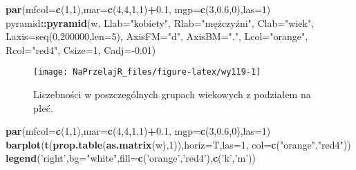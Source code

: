 \documentclass[polish,]{book}
\newenvironment{Shaded}{\begin{snugshade}}{\end{snugshade}}
\newcommand{\DataTypeTok}[1]{\textcolor[rgb]{0.13,0.29,0.53}{#1}}
\newcommand{\DecValTok}[1]{\textcolor[rgb]{0.00,0.00,0.81}{#1}}
\newcommand{\FloatTok}[1]{\textcolor[rgb]{0.00,0.00,0.81}{#1}}
\newcommand{\KeywordTok}[1]{\textcolor[rgb]{0.13,0.29,0.53}{\textbf{#1}}}
\newcommand{\NormalTok}[1]{#1}
\newcommand{\OperatorTok}[1]{\textcolor[rgb]{0.81,0.36,0.00}{\textbf{#1}}}
\newcommand{\StringTok}[1]{\textcolor[rgb]{0.31,0.60,0.02}{#1}}
\begin{document}
\begin{Shaded}
\begin{Highlighting}[]
\KeywordTok{par}\NormalTok{(}\DataTypeTok{mfcol=}\KeywordTok{c}\NormalTok{(}\DecValTok{1}\NormalTok{,}\DecValTok{1}\NormalTok{),}\DataTypeTok{mar=}\KeywordTok{c}\NormalTok{(}\DecValTok{4}\NormalTok{,}\DecValTok{4}\NormalTok{,}\DecValTok{1}\NormalTok{,}\DecValTok{1}\NormalTok{)}\OperatorTok{+}\FloatTok{0.1}\NormalTok{,}
    \DataTypeTok{mgp=}\KeywordTok{c}\NormalTok{(}\DecValTok{3}\NormalTok{,}\FloatTok{0.6}\NormalTok{,}\DecValTok{0}\NormalTok{),}\DataTypeTok{las=}\DecValTok{1}\NormalTok{)}
\NormalTok{pyramid}\OperatorTok{::}\KeywordTok{pyramid}\NormalTok{(w, }\DataTypeTok{Llab=}\StringTok{"kobiety"}\NormalTok{, }\DataTypeTok{Rlab=}\StringTok{"mężczyźni", Clab="}\NormalTok{wiek}\StringTok{",}
\StringTok{                 Laxis=seq(0,200000,len=5), AxisFM="}\NormalTok{d}\StringTok{", AxisBM="}\NormalTok{.}\StringTok{",}
\StringTok{                 Lcol="}\NormalTok{orange}\StringTok{", Rcol="}\NormalTok{red4}\StringTok{", Csize=1, Cadj=-0.01)}
\end{Highlighting}
\end{Shaded}

\begin{figure}[h]

{\centering \texttt{[image: NaPrzelajR\_files/figure-latex/wy119-1]} 

}

\caption{Liczebności w poszczególnych grupach wiekowych z podziałem na płeć.}\label{fig:wy119}
\end{figure}

\begin{Shaded}
\begin{Highlighting}[]
\KeywordTok{par}\NormalTok{(}\DataTypeTok{mfcol=}\KeywordTok{c}\NormalTok{(}\DecValTok{1}\NormalTok{,}\DecValTok{1}\NormalTok{),}\DataTypeTok{mar=}\KeywordTok{c}\NormalTok{(}\DecValTok{4}\NormalTok{,}\DecValTok{4}\NormalTok{,}\DecValTok{1}\NormalTok{,}\DecValTok{1}\NormalTok{)}\OperatorTok{+}\FloatTok{0.1}\NormalTok{,}
    \DataTypeTok{mgp=}\KeywordTok{c}\NormalTok{(}\DecValTok{3}\NormalTok{,}\FloatTok{0.6}\NormalTok{,}\DecValTok{0}\NormalTok{),}\DataTypeTok{las=}\DecValTok{1}\NormalTok{)}
\KeywordTok{barplot}\NormalTok{(}\KeywordTok{t}\NormalTok{(}\KeywordTok{prop.table}\NormalTok{(}\KeywordTok{as.matrix}\NormalTok{(w),}\DecValTok{1}\NormalTok{)),}\DataTypeTok{horiz=}\NormalTok{T,}\DataTypeTok{las=}\DecValTok{1}\NormalTok{,}
\DataTypeTok{col=}\KeywordTok{c}\NormalTok{(}\StringTok{"orange"}\NormalTok{,}\StringTok{"red4"}\NormalTok{))}
\KeywordTok{legend}\NormalTok{(}\StringTok{'right'}\NormalTok{,}\DataTypeTok{bg=}\StringTok{"white"}\NormalTok{,}\DataTypeTok{fill=}\KeywordTok{c}\NormalTok{(}\StringTok{'orange'}\NormalTok{,}\StringTok{'red4'}\NormalTok{),}\KeywordTok{c}\NormalTok{(}\StringTok{'k'}\NormalTok{,}\StringTok{'m'}\NormalTok{))}
\end{Highlighting}
\end{Shaded}
\end{document}
